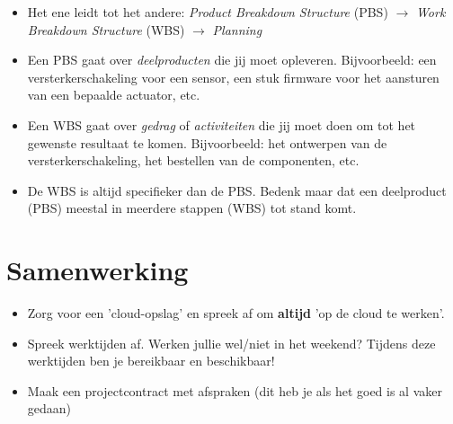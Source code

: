 \documentclass[24pt,a4paper]{article}
\begin{document}
\begin{itemize}
      \item Het ene leidt tot het andere: \textit{Product Breakdown Structure} (PBS) \textbf{$\rightarrow$} \textit{Work Breakdown Structure} (WBS)
            $\rightarrow$ \textit{Planning}
      \item Een PBS gaat over \textit{deelproducten} die jij moet opleveren. Bijvoorbeeld: een versterkerschakeling voor een sensor, een stuk firmware voor het aansturen van een bepaalde actuator, etc.
      \item Een WBS gaat over \textit{gedrag} of \textit{activiteiten} die jij moet doen om tot het gewenste resultaat te komen. Bijvoorbeeld: het ontwerpen van de versterkerschakeling, het bestellen van de componenten, etc.
      \item De WBS is altijd specifieker dan de PBS. Bedenk maar dat een deelproduct (PBS) meestal in meerdere stappen (WBS) tot stand komt.
\end{itemize}

\section{Samenwerking}
\begin{itemize}
      \mssep
      \item Zorg voor een 'cloud-opslag' en spreek af om \textbf{altijd} 'op de cloud te werken'.
      \item Spreek werktijden af. Werken jullie wel/niet in het weekend? Tijdens deze werktijden ben je bereikbaar en beschikbaar!
      \item Maak een projectcontract met afspraken (dit heb je als het goed is al vaker gedaan)
\end{itemize}
\end{document}
